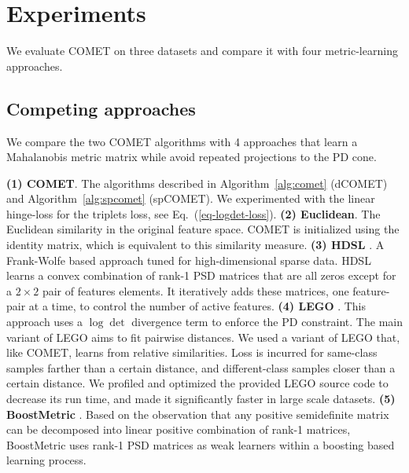 \documentclass[twoside,11pt]{article}
\renewcommand{\eqref}[1]{Eq.~(\ref{#1})}
\begin{document}

\section{Experiments}\vskip -5pt
We evaluate COMET on three datasets and compare it with four metric-learning approaches. 

\subsection{Competing approaches}\vskip -5pt
We compare the two COMET algorithms with 4 approaches that learn a Mahalanobis metric matrix while avoid repeated projections to the PD cone.

\textbf{(1) COMET}. The algorithms described in Algorithm~\ref{alg:comet} (dCOMET) and Algorithm~\ref{alg:spcomet} (spCOMET). We experimented with the linear hinge-loss for the triplets loss, see \eqref{eq-logdet-loss}. \textbf{(2) Euclidean}. The Euclidean similarity in the original feature space. COMET is initialized using the identity matrix, which is equivalent to this similarity measure.  \textbf{(3) HDSL} \citep{HDSL}. A Frank-Wolfe based approach tuned for high-dimensional sparse data. HDSL learns a convex combination of rank-1 PSD matrices that are all zeros except for a $2\times2$ pair of features elements. It iteratively adds these matrices, one feature-pair at a time, to control the number of active features. \textbf{(4) LEGO} \citep{lego}. This approach uses a $\log \det$ divergence term to enforce the PD constraint. The main variant of LEGO aims to fit pairwise distances. We used a variant of LEGO that, like COMET, learns from relative similarities. Loss is incurred for same-class samples farther than a certain distance, and different-class samples closer than a certain distance. We profiled and optimized the provided LEGO source code to decrease its run time, and made it significantly faster in large scale datasets. \textbf{(5) BoostMetric} \citep{boost}. Based on the observation that any positive semidefinite matrix can be decomposed into linear positive combination of rank-1 matrices, BoostMetric uses rank-1 PSD matrices as weak learners within a boosting based learning process.
\end{document}
